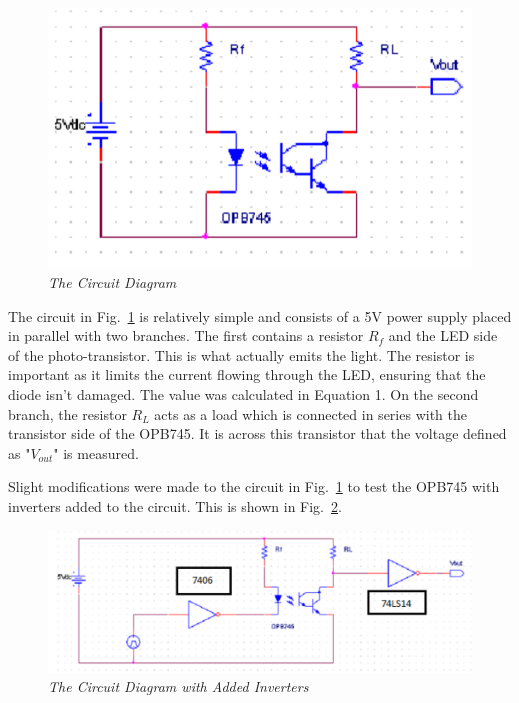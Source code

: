 \documentclass[conference]{IEEEtran}
\begin{document}
\begin{figure}[H]
    \centering
    \includegraphics[width=\linewidth]{Images/Part 1 Circuit.png} %
    \caption{\textit{The Circuit Diagram}}
    \label{fig:circuit_1}
\end{figure}

The circuit in Fig.~\ref{fig:circuit_1} is relatively simple and consists of a 5V power supply placed in parallel with two branches.
The first contains a resistor $R_f$ and the LED side of the photo-transistor. This is what actually emits the light. The resistor is
important as it limits the current flowing through the LED, ensuring that the diode isn't damaged. The value was calculated in
Equation 1. On the second branch, the resistor $R_L$ acts as a load which is connected in series with the transistor side of the
OPB745. It is across this transistor that the voltage defined as "$V_{out}$" is measured.

Slight modifications were made to the circuit in Fig.~\ref{fig:circuit_1} to test the OPB745 with inverters added to the circuit.
This is shown in Fig.~\ref{fig:circuit_2}.

\begin{figure}[H]
    \centering
    \includegraphics[width=\linewidth]{Images/Part 2 Circuit.png} %
    \caption{\textit{The Circuit Diagram with Added Inverters}}
    \label{fig:circuit_2}
\end{figure}
\end{document}
